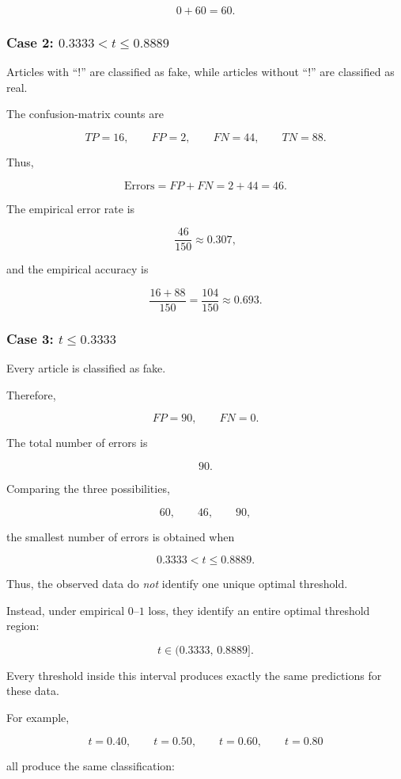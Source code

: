 \documentclass[11pt]{article}
\begin{document}
\[
0+60=60.
\]

\subsubsection*{Case 2: $0.3333<t\leq0.8889$}

Articles with ``!'' are classified as fake, while articles without ``!'' are
classified as real.

The confusion-matrix counts are

\[
TP=16,
\qquad
FP=2,
\qquad
FN=44,
\qquad
TN=88.
\]

Thus,

\[
\text{Errors}
=
FP+FN
=
2+44
=
46.
\]

The empirical error rate is

\[
\frac{46}{150}
\approx
0.307,
\]

and the empirical accuracy is

\[
\frac{16+88}{150}
=
\frac{104}{150}
\approx
0.693.
\]

\subsubsection*{Case 3: $t\leq0.3333$}

Every article is classified as fake.

Therefore,

\[
FP=90,
\qquad
FN=0.
\]

The total number of errors is

\[
90.
\]

Comparing the three possibilities,

\[
60,\qquad 46,\qquad 90,
\]

the smallest number of errors is obtained when

\[
\boxed{
0.3333<t\leq0.8889.
}
\]

Thus, the observed data do \emph{not} identify one unique optimal threshold.

Instead, under empirical $0$--$1$ loss, they identify an entire optimal
threshold region:

\[
\boxed{
t\in(0.3333,\,0.8889].
}
\]

Every threshold inside this interval produces exactly the same predictions for
these data.

For example,

\[
t=0.40,\qquad
t=0.50,\qquad
t=0.60,\qquad
t=0.80
\]

all produce the same classification:
\end{document}

